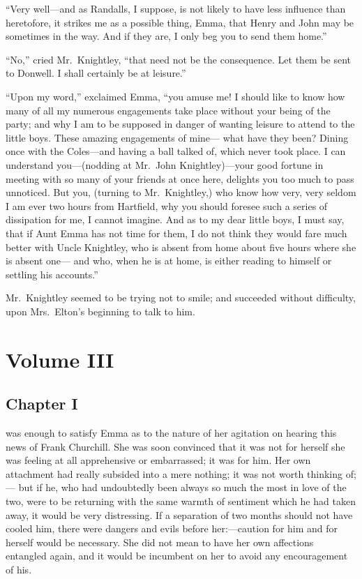 ``Very well---and as Randalls, I suppose, is not likely to have less
influence than heretofore, it strikes me as a possible thing, Emma,
that Henry and John may be sometimes in the way.  And if they are,
I only beg you to send them home.''

``No,'' cried Mr.\ Knightley, ``that need not be the consequence.
Let them be sent to Donwell.  I shall certainly be at leisure.''

``Upon my word,'' exclaimed Emma, ``you amuse me!  I should like to know
how many of all my numerous engagements take place without your being
of the party; and why I am to be supposed in danger of wanting leisure
to attend to the little boys.  These amazing engagements of mine---%
what have they been?  Dining once with the Coles---and having a ball
talked of, which never took place.  I can understand you---(nodding at
Mr.\ John Knightley)---your good fortune in meeting with so many of
your friends at once here, delights you too much to pass unnoticed.
But you, (turning to Mr.\ Knightley,) who know how very, very seldom
I am ever two hours from Hartfield, why you should foresee such a
series of dissipation for me, I cannot imagine.  And as to my dear
little boys, I must say, that if Aunt Emma has not time for them,
I do not think they would fare much better with Uncle Knightley,
who is absent from home about five hours where she is absent one---%
and who, when he is at home, is either reading to himself or settling
his accounts.''

Mr.\ Knightley seemed to be trying not to smile; and succeeded
without difficulty, upon Mrs.\ Elton's beginning to talk to him.




\cleartorecto
\part{Volume III}



\chapter{Chapter I}


 was enough to satisfy Emma as to the
nature of her agitation on hearing this news of Frank Churchill.
She was soon convinced that it was not for herself she was feeling at
all apprehensive or embarrassed; it was for him.  Her own attachment
had really subsided into a mere nothing; it was not worth thinking of;---%
but if he, who had undoubtedly been always so much the most in love
of the two, were to be returning with the same warmth of sentiment
which he had taken away, it would be very distressing.  If a separation
of two months should not have cooled him, there were dangers and evils
before her:---caution for him and for herself would be necessary.
She did not mean to have her own affections entangled again,
and it would be incumbent on her to avoid any encouragement of his.

